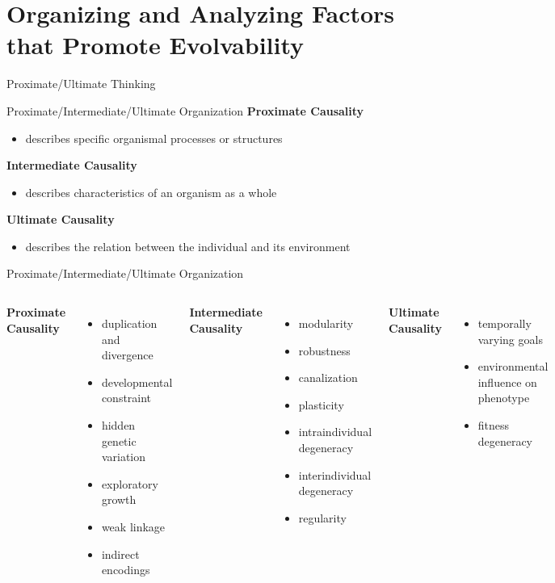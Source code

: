 \section{Organizing and Analyzing Factors that Promote Evolvability}

\begin{frame}{Proximate/Ultimate Thinking}
  
\end{frame}

\begin{frame}{Proximate/Intermediate/Ultimate Organization}
\textbf{Proximate Causality}
\begin{itemize}
  \item describes specific organismal processes or structures 
\end{itemize}
\textbf{Intermediate Causality}
\begin{itemize}
  \item describes characteristics of an organism as a whole
\end{itemize}
\textbf{Ultimate Causality}
\begin{itemize}
  \item describes the relation between the individual and its environment
\end{itemize}
\end{frame}

\begin{frame}{Proximate/Intermediate/Ultimate Organization}
\begin{columns}[T,onlytextwidth]
\textbf{Proximate Causality}
\begin{itemize}
  \item duplication and divergence
  \item developmental constraint
  \item hidden genetic variation
  \item exploratory growth
  \item weak linkage
  \item indirect encodings
\end{itemize}
\textbf{Intermediate Causality}
\begin{itemize}
  \item modularity
  \item robustness
  \item canalization
  \item plasticity
  \item intraindividual degeneracy
  \item interindividual degeneracy
  \item regularity
\end{itemize}
\textbf{Ultimate Causality}
\begin{itemize}
  \item temporally varying goals
  \item environmental influence on phenotype
  \item fitness degeneracy
\end{itemize}

\end{columns}
\end{frame}

